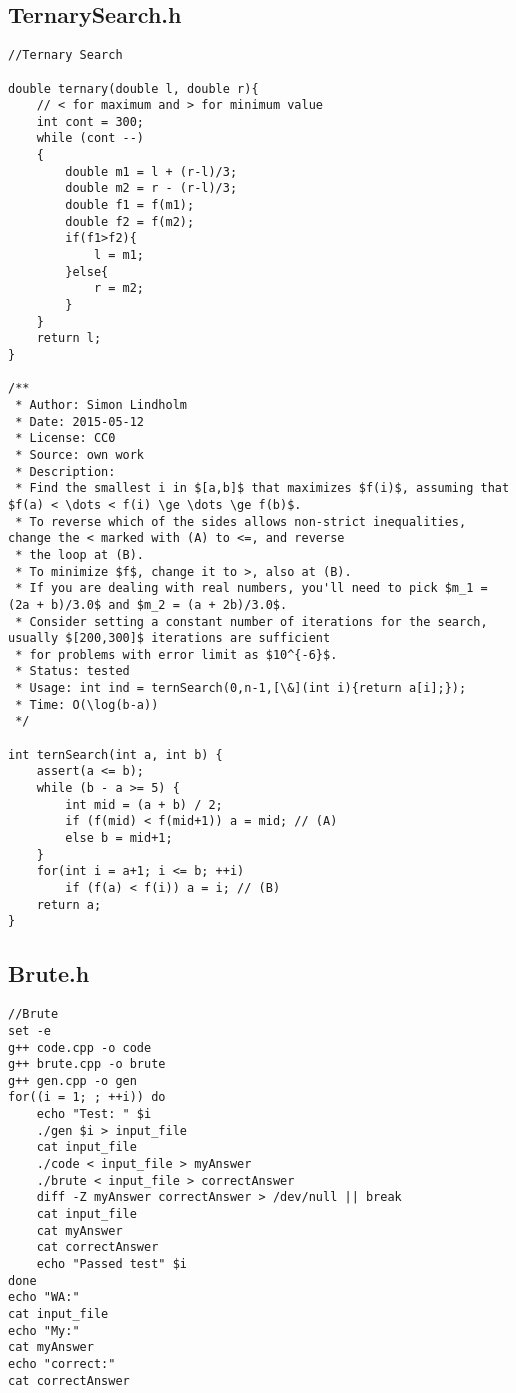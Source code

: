 \documentclass[11pt, a4paper, twoside]{article}
\begin{document}
\subsection{TernarySearch.h}
\begin{verbatim}
//Ternary Search

double ternary(double l, double r){
    // < for maximum and > for minimum value
    int cont = 300;
    while (cont --)
    {
        double m1 = l + (r-l)/3;
        double m2 = r - (r-l)/3;
        double f1 = f(m1);
        double f2 = f(m2);
        if(f1>f2){
            l = m1;
        }else{
            r = m2;
        }
    }
    return l;
}

/**
 * Author: Simon Lindholm
 * Date: 2015-05-12
 * License: CC0
 * Source: own work
 * Description:
 * Find the smallest i in $[a,b]$ that maximizes $f(i)$, assuming that $f(a) < \dots < f(i) \ge \dots \ge f(b)$.
 * To reverse which of the sides allows non-strict inequalities, change the < marked with (A) to <=, and reverse 
 * the loop at (B).
 * To minimize $f$, change it to >, also at (B).
 * If you are dealing with real numbers, you'll need to pick $m_1 = (2a + b)/3.0$ and $m_2 = (a + 2b)/3.0$. 
 * Consider setting a constant number of iterations for the search, usually $[200,300]$ iterations are sufficient
 * for problems with error limit as $10^{-6}$.
 * Status: tested
 * Usage: int ind = ternSearch(0,n-1,[\&](int i){return a[i];});
 * Time: O(\log(b-a))
 */

int ternSearch(int a, int b) {
	assert(a <= b);
	while (b - a >= 5) {
		int mid = (a + b) / 2;
		if (f(mid) < f(mid+1)) a = mid; // (A)
		else b = mid+1;
	}
	for(int i = a+1; i <= b; ++i) 
		if (f(a) < f(i)) a = i; // (B)
	return a;
}
\end{verbatim}

\subsection{Brute.h}
\begin{verbatim}
//Brute
set -e
g++ code.cpp -o code
g++ brute.cpp -o brute
g++ gen.cpp -o gen
for((i = 1; ; ++i)) do
    echo "Test: " $i
    ./gen $i > input_file
    cat input_file
    ./code < input_file > myAnswer
    ./brute < input_file > correctAnswer
    diff -Z myAnswer correctAnswer > /dev/null || break
    cat input_file
    cat myAnswer
    cat correctAnswer
    echo "Passed test" $i
done
echo "WA:"
cat input_file
echo "My:"
cat myAnswer
echo "correct:"
cat correctAnswer
\end{verbatim}
\end{document}

